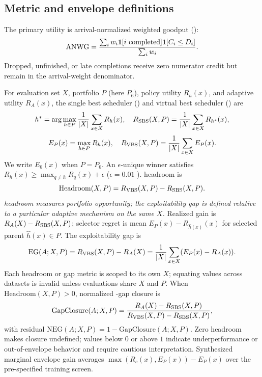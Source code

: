 \documentclass[runningheads]{llncs}
\begin{document}
\subsection{Metric and envelope definitions}
\label{sec:metrics}

The primary utility is arrival-normalized weighted goodput (\anwg{}):
\begin{equation}
\label{eq:anwg}
  \mathrm{ANWG{}} =
  \frac{\sum_i w_i \mathbf{1}[i\ \mathrm{completed}] \mathbf{1}[C_i \le D_i]}
       {\sum_i w_i}.
\end{equation}
Dropped, unfinished, or late completions receive zero numerator credit but
remain in the arrival-weight denominator.

For evaluation set $X$, portfolio $P$ (here $P_6$), policy utility $R_h(x)$,
and adaptive utility $R_A(x)$, the single best scheduler (\sbs{}) and virtual
best scheduler (\vbs{}) are
\begin{equation}
\label{eq:sbs}
  h^* = \arg\max_{h \in P} \frac{1}{|X|}\sum_{x \in X} R_h(x),
  \quad
  R_{\mathrm{SBS{}}}(X,P)
  =
  \frac{1}{|X|}\sum_{x \in X} R_{h^*}(x),
\end{equation}
\begin{equation}
\label{eq:vbs}
  E_P(x) = \max_{h \in P} R_h(x),
  \quad
  R_{\mathrm{VBS{}}}(X,P)
  =
  \frac{1}{|X|}\sum_{x \in X} E_P(x).
\end{equation}
We write $E_6(x)$ when $P=P_6$. An $\epsilon$-unique winner satisfies
$R_h(x) \ge \max_{q\ne h} R_q(x)+\epsilon$ ($\epsilon=0.01$ \anwg{}).
\vbs{} headroom is
\begin{equation}
\label{eq:headroom}
  \mathrm{Headroom}(X,P)
  =
  R_{\mathrm{VBS{}}}(X,P) - R_{\mathrm{SBS{}}}(X,P).
\end{equation}
\emph{\vbs{} headroom measures portfolio opportunity; the exploitability gap is
defined relative to a particular adaptive mechanism on the same $X$.}
Realized gain is $R_A(X)-R_{\mathrm{SBS{}}}(X,P)$; selector regret is mean
$E_P(x)-R_{\hat h(x)}(x)$ for selected parent $\hat h(x)\in P$.
The exploitability gap is
\begin{equation}
\label{eq:eg}
  \mathrm{EG}(A;X,P)
  =
  R_{\mathrm{VBS{}}}(X,P) - R_A(X)
  =
  \frac{1}{|X|}\sum_{x \in X}(E_P(x)-R_A(x)).
\end{equation}
Each headroom or gap metric is scoped to its own $X$; equating values across
datasets is invalid unless evaluations share $X$ and $P$.
When $\mathrm{Headroom}(X,P)>0$, normalized \vbs{}-gap closure is
\begin{equation}
\label{eq:gapclosure}
  \mathrm{GapClosure}(A;X,P)
  =
  \frac{R_A(X) - R_{\mathrm{SBS{}}}(X,P)}
       {R_{\mathrm{VBS{}}}(X,P) - R_{\mathrm{SBS{}}}(X,P)},
\end{equation}
with residual $\mathrm{NEG}(A;X,P)=1-\mathrm{GapClosure}(A;X,P)$.
Zero headroom makes closure undefined; values below $0$ or above $1$ indicate
underperformance or out-of-envelope behavior and require cautious
interpretation. Synthesized marginal envelope gain averages
$\max(R_c(x),E_P(x))-E_P(x)$ over the pre-specified training screen.
\end{document}
